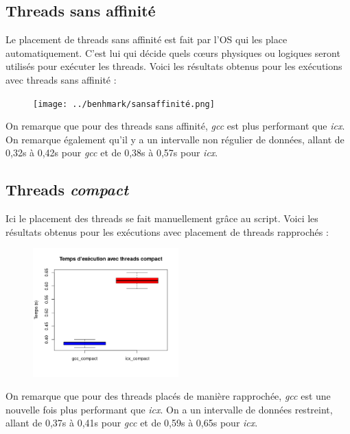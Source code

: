 \documentclass{rapport}
\begin{document}
        \subsection{Threads sans affinité}
        Le placement de threads sans affinité est fait par l'OS qui les place automatiquement. C'est lui qui décide quels cœurs physiques ou logiques seront utilisés pour exécuter les threads.
            Voici les résultats obtenus pour les exécutions avec threads sans affinité : 

            \begin{figure}[H]
                \centering
                \texttt{[image: ../benhmark/sansaffinité.png]}
            \end{figure}
                
            On remarque que pour des threads sans affinité, \textit{gcc} est plus performant que \textit{icx}. On remarque également qu'il y a un intervalle non régulier de données, allant de 0,32s à 0,42s pour \textit{gcc} et de 0,38s à 0,57s pour \textit{icx}.
        \subsection{Threads \textit{compact}}
        Ici le placement des threads se fait manuellement grâce au script.
        \newline
            Voici les résultats obtenus pour les exécutions avec placement de threads rapprochés :

            \begin{figure}[H]
                \centering
                \includegraphics[width=0.5\textwidth]{../benhmark/compact.png}
            \end{figure}

            On remarque que pour des threads placés de manière rapprochée, \textit{gcc} est une nouvelle fois plus performant que \textit{icx}. On a un intervalle de données restreint, allant de 0,37s à 0,41s pour \textit{gcc} et de 0,59s à 0,65s pour \textit{icx}.
\end{document}
